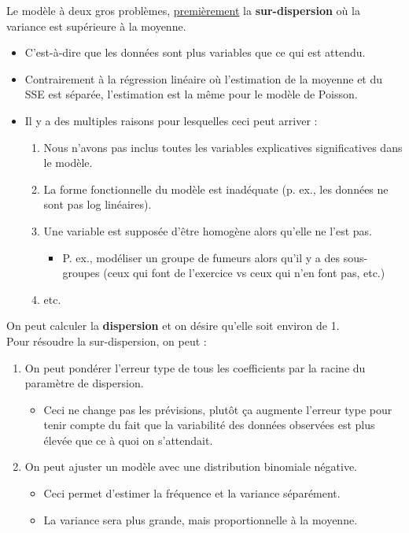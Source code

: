 \documentclass[french]{article}
\begin{document}
\begin{multicols*}{2}
Le modèle à deux gros problèmes, \underline{premièrement} la \textbf{sur-dispersion} où la variance est supérieure à la moyenne.
\begin{itemize}
		\item	C'est-à-dire que les données sont plus variables que ce qui est attendu.
		\item	Contrairement à la régression linéaire où l'estimation de la moyenne et du SSE est séparée, l'estimation est la même pour le modèle de Poisson.
		\item	Il y a des multiples raisons pour lesquelles ceci peut arriver : 
			\begin{enumerate}
			\item	Nous n'avons pas inclus toutes les variables explicatives significatives dans le modèle.
			\item	La forme fonctionnelle du modèle est inadéquate (p. ex., les données ne sont pas log linéaires).
			\item	Une variable est supposée d'être homogène alors qu'elle ne l'est pas.
				\begin{itemize}
				\item	P. ex., modéliser un groupe de fumeurs alors qu'il y a des sous-groupes (ceux qui font de l'exercice vs ceux qui n'en font pas, etc.)
				\end{itemize}
			\item	etc.
			\end{enumerate}
\end{itemize}

On peut calculer la \textbf{dispersion} et on désire qu'elle soit environ de 1.\\
Pour résoudre la sur-dispersion, on peut : 
\begin{enumerate}
	\item	On peut pondérer l'erreur type de tous les coefficients par la racine du paramètre de dispersion.
		\begin{itemize}
		\item	Ceci ne change pas les prévisions, plutôt ça augmente l'erreur type pour tenir compte du fait que la variabilité des données observées est plus élevée que ce à quoi on s'attendait.
		\end{itemize}
	\item	On peut ajuster un modèle avec une distribution binomiale négative.
		\begin{itemize}
		\item	Ceci permet d'estimer la fréquence et la variance séparément.
		\item	La variance sera plus grande, mais proportionnelle à la moyenne.
		\end{itemize}
\end{enumerate}



\end{multicols*}
\end{document}
